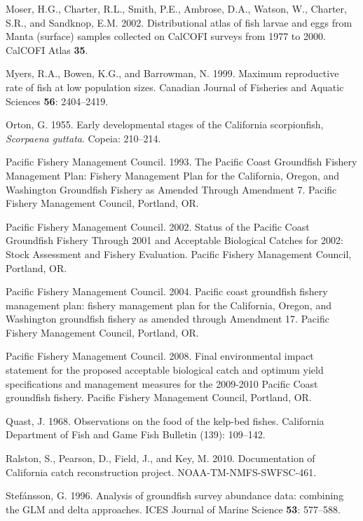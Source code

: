 \documentclass[12pt,]{article}
\begin{document}
\hypertarget{ref-Moser2002}{}
Moser, H.G., Charter, R.L., Smith, P.E., Ambrose, D.A., Watson, W.,
Charter, S.R., and Sandknop, E.M. 2002. Distributional atlas of fish
larvae and eggs from Manta (surface) samples collected on CalCOFI
surveys from 1977 to 2000. CalCOFI Atlas \textbf{35}.

\hypertarget{ref-Myers1999}{}
Myers, R.A., Bowen, K.G., and Barrowman, N. 1999. Maximum reproductive
rate of fish at low population sizes. Canadian Journal of Fisheries and
Aquatic Sciences \textbf{56}: 2404--2419.

\hypertarget{ref-Orton1955}{}
Orton, G. 1955. Early developmental stages of the California
scorpionfish, \emph{Scorpaena guttata}. Copeia: 210--214.

\hypertarget{ref-PFMC1993}{}
Pacific Fishery Management Council. 1993. The Pacific Coast Groundfish
Fishery Management Plan: Fishery Management Plan for the California,
Oregon, and Washington Groundfish Fishery as Amended Through Amendment
7. Pacific Fishery Management Council, Portland, OR.

\hypertarget{ref-PFMC2002}{}
Pacific Fishery Management Council. 2002. Status of the Pacific Coast
Groundfish Fishery Through 2001 and Acceptable Biological Catches for
2002: Stock Assessment and Fishery Evaluation. Pacific Fishery
Management Council, Portland, OR.

\hypertarget{ref-PFMC2004}{}
Pacific Fishery Management Council. 2004. Pacific coast groundfish
fishery management plan: fishery management plan for the California,
Oregon, and Washington groundfish fishery as amended through Amendment
17. Pacific Fishery Management Council, Portland, OR.

\hypertarget{ref-PFMC2008}{}
Pacific Fishery Management Council. 2008. Final environmental impact
statement for the proposed acceptable biological catch and optimum yield
specifications and management measures for the 2009-2010 Pacific Coast
groundfish fishery. Pacific Fishery Management Council, Portland, OR.

\hypertarget{ref-Quast1968}{}
Quast, J. 1968. Observations on the food of the kelp-bed fishes.
California Department of Fish and Game Fish Bulletin (139): 109--142.

\hypertarget{ref-Ralston2010}{}
Ralston, S., Pearson, D., Field, J., and Key, M. 2010. Documentation of
California catch reconstruction project. NOAA-TM-NMFS-SWFSC-461.

\hypertarget{ref-Stefansson1996}{}
Stefánsson, G. 1996. Analysis of groundfish survey abundance data:
combining the GLM and delta approaches. ICES Journal of Marine Science
\textbf{53}: 577--588.
\end{document}
